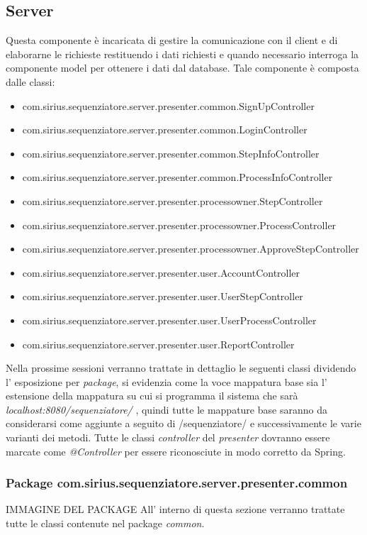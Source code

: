 \subsection{Server}
Questa componente è incaricata di gestire la comunicazione con il client e di elaborarne le richieste restituendo i dati richiesti e quando necessario interroga la componente model per ottenere i dati dal database.
Tale componente è composta dalle classi:
\begin{itemize}
	\item com.sirius.sequenziatore.server.presenter.common.SignUpController
	\item com.sirius.sequenziatore.server.presenter.common.LoginController
	\item com.sirius.sequenziatore.server.presenter.common.StepInfoController
	\item com.sirius.sequenziatore.server.presenter.common.ProcessInfoController
	\item com.sirius.sequenziatore.server.presenter.processowner.StepController
	\item com.sirius.sequenziatore.server.presenter.processowner.ProcessController
	\item com.sirius.sequenziatore.server.presenter.processowner.ApproveStepController
	\item com.sirius.sequenziatore.server.presenter.user.AccountController
	\item com.sirius.sequenziatore.server.presenter.user.UserStepController
	\item com.sirius.sequenziatore.server.presenter.user.UserProcessController
	\item com.sirius.sequenziatore.server.presenter.user.ReportController
\end{itemize}
Nella prossime sessioni verranno trattate in dettaglio le seguenti classi dividendo l' esposizione per \textit{package}, si evidenzia come la voce mappatura base sia l' estensione della mappatura su cui si programma il sistema che sarà \textit{localhost:8080/sequenziatore/} , quindi tutte le mappature base saranno da considerarsi come aggiunte a seguito di /sequenziatore/ e successivamente le varie varianti dei metodi.
Tutte le classi \textit{controller} del \textit{presenter} dovranno essere marcate come \textit{@Controller} per essere riconosciute in modo corretto da Spring.
\subsubsection{Package com.sirius.sequenziatore.server.presenter.common}
IMMAGINE DEL PACKAGE
All' interno di questa sezione verranno trattate tutte le classi contenute nel package \textit{common}.
